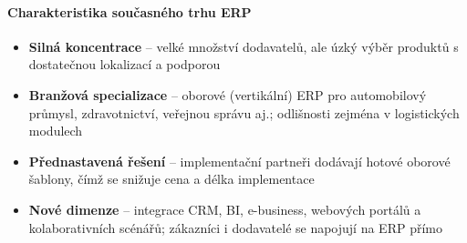 \paragraph{Charakteristika současného trhu ERP}
\begin{itemize}
  \item \textbf{Silná koncentrace} -- velké množství dodavatelů, ale úzký výběr produktů
    s dostatečnou lokalizací a podporou
  \item \textbf{Branžová specializace} -- oborové (vertikální) ERP pro automobilový průmysl,
    zdravotnictví, veřejnou správu aj.; odlišnosti zejména v logistických modulech
  \item \textbf{Přednastavená řešení} -- implementační partneři dodávají hotové oborové šablony,
    čímž se snižuje cena a délka implementace
  \item \textbf{Nové dimenze} -- integrace CRM, BI, e-business, webových portálů a kolaborativních
    scénářů; zákazníci i dodavatelé se napojují na ERP přímo
\end{itemize}

